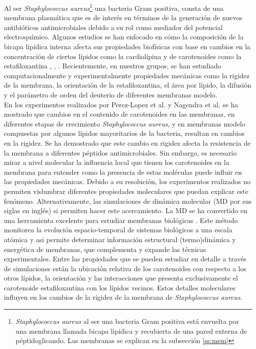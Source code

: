 Al ser \textit{Staphylococcus aureus}\footnote{\textit{Staphylococcus aureus} al ser una bacteria Gram positiva est\'{a} envuelta por una  membrana llamada bicapa lip\'{i}dica y recubierta de una pared externa de p\'{e}ptidoglicando. Las membranas se explican en la subsecci\'{o}n \ref{ss:mem}} una bacteria Gram positiva, consta de una membrana plasm\'{a}tica que es de inter\'{e}s en t\'{e}rminos de la generaci\'{o}n de nuevos antibi\'{o}ticos antimicrobiales debido a su rol como mediador del potencial electroqu\'{i}mico. Algunos estudios se han enfocado en c\'{o}mo la composici\'{o}n de la bicapa lip\'{i}dica interna afecta sus propiedades biof\'{i}sicas con base en cambios en la concentraci\'{o}n de ciertos l\'{i}pidos como la cardiolipina \cite{Hernandez-Villa1BiophysicalPeptides} y de carotenoides como la estafiloxantina \cite{MelendezDelgado2018StudyingBilayers}, \cite{Perez-LopezVariationsProperties}, \cite{Nagendra2011}. Recientemente, en nuestros grupos, se han estudiado computacionalmente y experimentalmente propiedades mec\'{a}nicas como la rigidez de la membrana, la orientaci\'{o}n de la estafiloxantina, el \'{a}rea por l\'{i}pido, la difusi\'{o}n y el par\'{a}metro de orden del deuterio de diferentes membranas modelo.\\

En los experimentos realizados por Perez-Lopez et al. \cite{Perez-LopezVariationsProperties} y Nagendra et al.  \cite{Nagendra2011} se ha mostrado que cambios en el contenido de carotenoides en las membranas, en diferentes etapas de crecimiento \textit{Staphylococcus aureus}, y en membranas modelo compuestas por algunos l\'{i}pidos mayoritarios de la bacteria, resultan en cambios en la rigidez. Se ha demostrado que este cambio en rigidez afecta la resistencia de la membrana a diferentes p\'{e}ptidos antimicrobiales. Sin embargo, es necesario mirar a nivel molecular la influencia local que tienen los carotenoides en la membrana para entender como la presencia de estas mol\'{e}culas puede influir en las propiedades mec\'{a}nicas. Debido a su resoluci\'{o}n, los experimentos realizados no permiten vislumbrar diferentes propiedades moleculares que puedan explicar este fen\'{o}meno. Alternativamente, las simulaciones de din\'{a}mica molecular (MD por sus siglas en ingl\'{e}s) si permiten hacer este acercamiento. La MD se ha convertido en una herramienta excelente para estudiar membranas biol\'{o}gicas \cite{Marrink2019ComputationalMembranes}. Este m\'{e}todo monitorea la evoluci\'{o}n espacio-temporal de sistemas biol\'{o}gicos a una escala at\'{o}mica y asi permite determinar informaci\'{o}n estructural (termo)din\'{a}mica y energ\'{e}tica de membranas, que complementa y expande las t\'{e}cnicas experimentales. 
Entre las propiedades que se pueden estudiar en detalle a trav\'{e}s de simulaciones est\'{a}n la ubicaci\'{o}n relativa de los carotenoides con respecto a los otros l\'{i}pidos, la orientaci\'{o}n y las interacciones que presenta exclusivamente el carotenoide estafiloxantina con los l\'{i}pidos vecinos. Estos detalles moleculares influyen en los cambios de la rigidez de la membrana de \textit{Staphylococcus aureus}.\\

